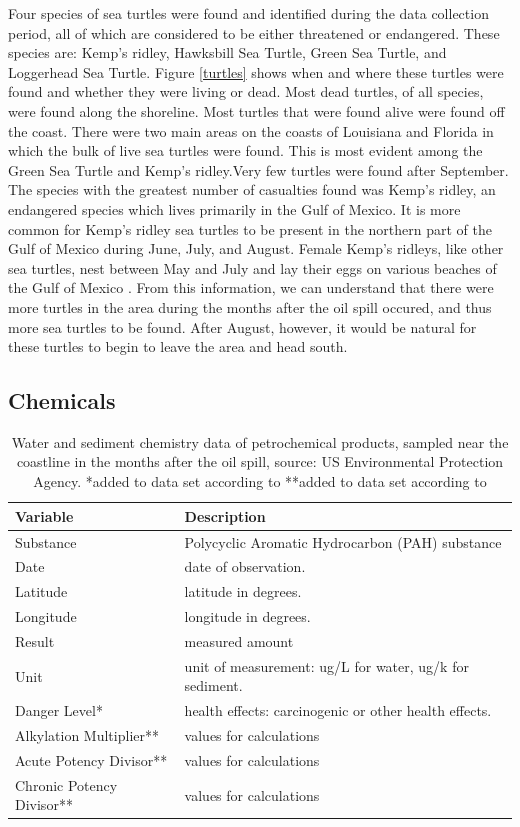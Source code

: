 \documentclass[authoryear,12pt]{elsarticle}
\begin{document}
Four species of sea turtles were found and identified during the data collection period, all of which are considered to be either threatened or endangered. These species are: Kemp's ridley, Hawksbill Sea Turtle, Green Sea Turtle, and Loggerhead Sea Turtle. Figure \ref{turtles} shows when and where these turtles were found and whether they were living or dead. Most dead turtles, of all species, were found along the shoreline. Most turtles that were found alive were found off the coast. There were two main areas on the coasts of Louisiana and Florida in which the bulk of live sea turtles were found.  This is most evident among the Green Sea Turtle and Kemp's ridley.Very few turtles were found after September. The species with the greatest number of casualties found was Kemp's ridley, an endangered species which lives primarily in the Gulf of Mexico.  It is more common for Kemp's ridley sea turtles to be present in the northern part of the Gulf of Mexico during June, July, and August. Female Kemp's ridleys, like other sea turtles, nest between May and July and lay their eggs on various beaches of the Gulf of Mexico  \citet{turtles}. From this information, we can understand that there were more turtles in the area during the months after the oil spill occured, and thus more sea turtles to be found.  After August, however, it would be natural for these turtles to begin to leave the area and head south.

\subsection{Chemicals}

\begin{table}
\begin{tabular}{lp{9.5cm}}
\bf Variable & \bf Description \\\hline
Substance & Polycyclic Aromatic Hydrocarbon (PAH) substance \\
Date & date of observation.\\
Latitude & latitude in degrees. \\
Longitude & longitude in degrees. \\
Result &  measured amount \\
Unit &  unit of measurement: ug/L for water, ug/k for sediment. \\
Danger Level* &  health effects: carcinogenic or other health effects. \\
Alkylation Multiplier** & values for calculations \\
Acute Potency Divisor** & values for calculations\\
Chronic Potency Divisor** & values for calculations 
\end{tabular}
\label{table.chemicals}
\caption{Water and sediment chemistry data of petrochemical products, sampled near the coastline in the months after the oil spill, source: US Environmental  Protection Agency.\newline
*added to data set according to \citet{pah-danger} \newline
**added to data set according to \citet{pah-benchmark} }
\end{table}
\end{document}
